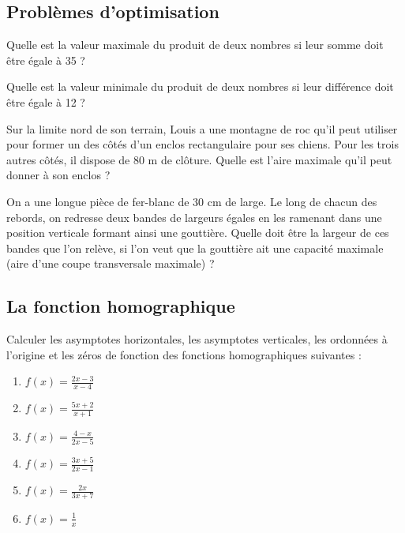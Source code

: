 \subsection{Problèmes d'optimisation}

\begin{exercice}
Quelle est la valeur maximale du produit de deux nombres si leur somme doit être égale à 35 ?
\end{exercice}

\begin{exercice}
Quelle est la valeur minimale du produit de deux nombres si leur différence doit être égale à 12 ?
\end{exercice}

\begin{exercice}
Sur la limite nord de son terrain, Louis a une montagne de roc qu'il peut utiliser pour former un des côtés d'un enclos rectangulaire pour ses chiens. Pour les trois autres côtés, il dispose de 80 m de clôture. Quelle est l'aire maximale qu'il peut donner à son enclos ?
\end{exercice}

\begin{exercice}
On a une longue pièce de fer-blanc de 30 cm de large. Le long de chacun des rebords, on redresse deux bandes de largeurs égales en les ramenant dans une position verticale formant ainsi une gouttière. Quelle doit être la largeur de ces bandes que l'on relève, si l'on veut que la gouttière ait une capacité maximale (aire d'une coupe transversale maximale) ?
\end{exercice}

\subsection{La fonction homographique}

\begin{exercice}
Calculer les asymptotes horizontales, les asymptotes verticales, les ordonnées à l'origine et les zéros de fonction des fonctions homographiques suivantes :
\begin{multicols}{2}
\begin{enumerate}
\item $f(x)=\frac{2x-3}{x-4}$
\item $f(x)=\frac{5x+2}{x+1}$
\item $f(x)=\frac{4-x}{2x-5}$
\item $f(x)=\frac{3x+5}{2x-1}$
\item $f(x)=\frac{2x}{3x+7}$
\item $f(x)=\frac{1}{x}$
\end{enumerate}
\end{multicols}
\end{exercice}


